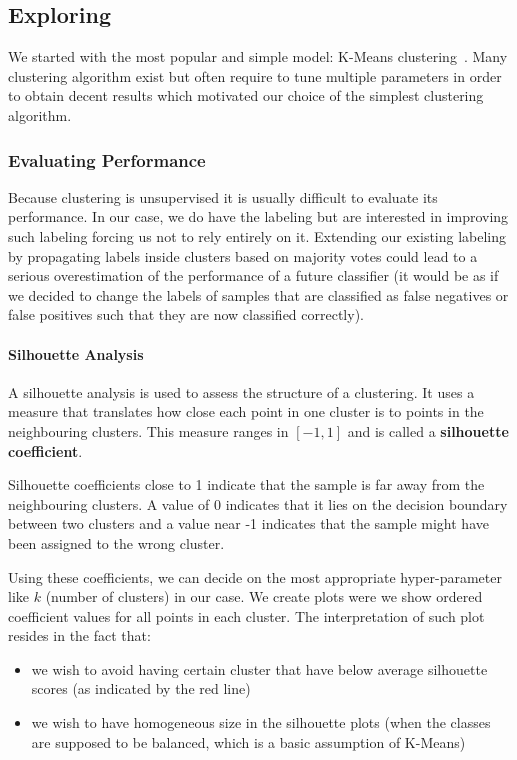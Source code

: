 \subsection{Exploring}
We started with the most popular and simple model: K-Means clustering~\cite{kmeans}. Many clustering algorithm exist but often require to tune multiple parameters in order to obtain decent results which motivated our choice of the simplest clustering algorithm.

\subsubsection{Evaluating Performance}
Because clustering is unsupervised it is usually difficult to evaluate its performance. In our case, we do have the labeling but are interested in improving such labeling forcing us not to rely entirely on it. Extending our existing labeling by propagating labels inside clusters based on majority votes could lead to a serious overestimation of the performance of a future classifier (it would be as if we decided to change the labels of samples that are classified as false negatives or false positives such that they are now classified correctly).

\paragraph{Silhouette Analysis}
A silhouette analysis is used to assess the structure of a clustering. It uses a measure that translates how close each point in one cluster is to points in the neighbouring clusters. This measure ranges in $[-1,1]$ and is called a \textbf{silhouette coefficient}. 

Silhouette coefficients close to 1 indicate that the sample is far away from the neighbouring clusters. A value of 0 indicates that it lies on the decision boundary between two clusters and a value near -1 indicates that the sample might have been assigned to the wrong cluster.

Using these coefficients, we can decide on the most appropriate hyper-parameter like $k$ (number of clusters) in our case. We create plots were we show ordered coefficient values for all points in each cluster. The interpretation of such plot resides in the fact that:
\begin{itemize}
	\item we wish to avoid having certain cluster that have below average silhouette scores (as indicated by the red line)
	\item we wish to have homogeneous size in the silhouette plots (when the classes are supposed to be balanced, which is a basic assumption of K-Means)
\end{itemize}

